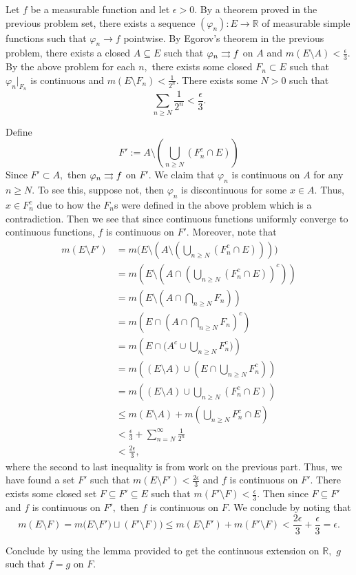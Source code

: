 \documentclass[11pt]{article}
\newcommand{\bbR}{\mathbb{R}}
\newcommand{\sm}{\setminus}
\begin{document}
\begin{enumerate}
\begin{solution}
        Let $f$ be a measurable function and let $\epsilon>0$. By a theorem proved in the previous problem set, there exists a sequence $(\varphi_n): E\to \bbR$ of measurable simple functions such that $\varphi_n \to f$ pointwise. By Egorov's theorem in the previous problem, there exists a closed $A\subseteq E$ such that $\varphi_n \overset{}{\rightrightarrows} f$ on $A$ and $m(E\sm A)< \frac{\epsilon}{3}.$ By the above problem for each $n,$ there exists some closed $F_n\subset E$ such that $\varphi_n|_{F_n}$ is continuous and $m(E\sm F_n) < \frac{1}{2^n}.$ There exists some $N >0$ such that
        \[\sum_{n\geq N}\frac{1}{2^n} < \frac{\epsilon}{3}.\]

        Define 
        \[F':= A \sm \left(\bigcup_{n\geq N}(F_n^c \cap E)\right)\] Since $F'\subset A,$ then $\varphi_n \overset{}{\rightrightarrows} f$ on $F'.$ We claim that $\varphi_n$ is continuous on $A$ for any $n\geq N.$ To see this, suppose not, then $\varphi_n$ is discontinuous for some $x\in A.$ Thus, $x\in F_n^c$ due to how the $F_n$s were defined in the above problem which is a contradiction. Then we see that since continuous functions uniformly converge to continuous functions, $f$ is continuous on $F'.$ Moreover, note that 
        \begin{align*}
            m(E\sm F') &= m\bigg(E \sm \left(A \sm \left(\bigcup_{n\geq N}(F_n^c \cap E)\right)\right)\bigg)\\
            &= m\left(E\sm \left(A \cap \left(\bigcup_{n\geq N}(F_n^c \cap E)\right)^c\right)\right)\\
            &= m\left(E \sm \left(A \cap \bigcap_{n\geq N}F_n\right)\right)\\
            &= m\left(E \cap \left(A \cap \bigcap_{n\geq N}F_n\right)^c\right)\\
            &= m\left(E \cap \bigg(A^c \cup \bigcup_{n\geq N} F_n^c\bigg)\right)\\
            &= m\left((E\sm A) \cup (E \cap \bigcup_{n\geq N}F_n ^c) \right)\\
            &= m\left((E\sm A) \cup \bigcup_{n\geq N}(F_n ^c \cap E)\right)\\
            &\leq m(E\sm A) + m(\bigcup_{n\geq N}F_n ^c \cap E)\\
            &< \frac{\epsilon}{3} + \sum_{n=N}^\infty \frac{1}{2^n}\\
            &< \frac{2\epsilon}{3},
        \end{align*}
    where the second to last inequality is from work on the previous part. Thus, we have found a set $F'$ such that $m(E\sm F') < \frac{2\epsilon}{3}$ and $f$ is continuous on $F'.$ There exists some closed set $F\subseteq F' \subseteq E$ such that $m(F' \sm F) < \frac{\epsilon}{3}.$ Then since $F \subseteq F'$ and $f$ is continuous on $F',$ then $f$ is continuous on $F.$ We conclude by noting that 
    \[m(E\sm F) = m\big(E\sm F') \sqcup (F'\sm F)\big) \leq m(E\sm F') + m(F'\sm F) < \frac{2\epsilon}{3} + \frac{\epsilon}{3}= \epsilon.\]

    Conclude by using the lemma provided to get the continuous extension on $\bbR,$ $g$ such that $f = g$ on $F.$
    \end{solution}
\end{enumerate}
\end{document}
